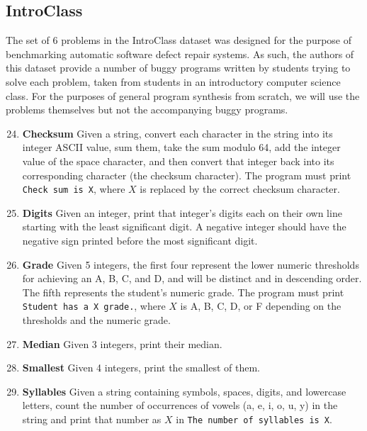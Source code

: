 \documentclass{sig-alternate}
\begin{document}
\subsection{IntroClass}


The set of 6 problems in the IntroClass dataset \cite{ManyBugsAndIntroClass, Brun13TRgptest} was designed for the purpose of benchmarking automatic software defect repair systems. As such, the authors of this dataset provide a number of buggy programs written by students trying to solve each problem, taken from students in an introductory computer science class. For the purposes of general program synthesis from scratch, we will use the problems themselves but not the accompanying buggy programs. 

\begin{enumerate}
\setcounter{enumi}{23}

\item
\textbf{Checksum}
Given a string, convert each character in the string into its integer ASCII value, sum them, take the sum modulo 64, add the integer value of the space character, and then convert that integer back into its corresponding character (the checksum character). The program must print \texttt{Check sum is X}, where $X$ is replaced by the correct checksum character.

\item
\textbf{Digits}
Given an integer, print that integer's digits each on their own line starting with the least significant digit. A negative integer should have the negative sign printed before the most significant digit.

\item
\textbf{Grade}
Given 5 integers, the first four represent the lower numeric thresholds for achieving an A, B, C, and D, and will be distinct and in descending order. The fifth represents the student's numeric grade. The program must print \texttt{Student has a X grade.}, where $X$ is A, B, C, D, or F depending on the thresholds and the numeric grade.

\item
\textbf{Median}
Given 3 integers, print their median.

\item
\textbf{Smallest}
Given 4 integers, print the smallest of them.

\item
\textbf{Syllables}
Given a string containing symbols, spaces, digits, and lowercase letters, count the number of occurrences of vowels (a, e, i, o, u, y) in the string and print that number as $X$ in \texttt{The number of syllables is X}.

\end{enumerate}
\end{document}
